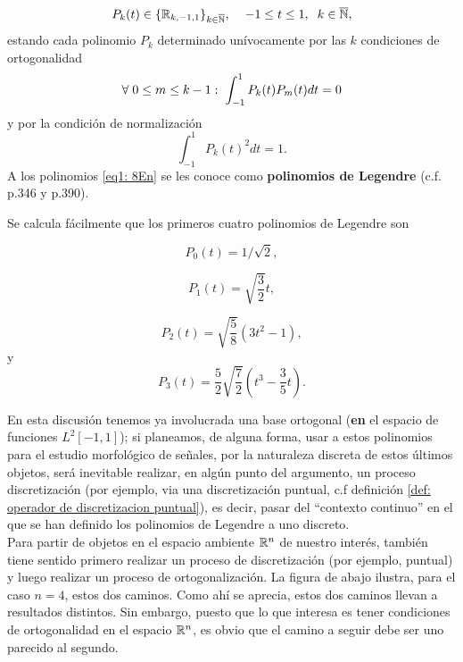 \begin{equation}
\label{eq1: 8En}
P_{k}(t)\in \{\mathbb{R}_{k, -1,1}\}_{k \in \overline{\mathbb{N}}}, \hspace{0.4cm}
-1 \leq t \leq 1, \hspace{0.2cm}
 k \in \overline{\mathbb{N}},
\end{equation}
estando cada polinomio $P_{k}$ determinado unívocamente
por las $k$ condiciones de ortogonalidad
\[
\forall \hspace{0.1cm} 0 \leq m \leq k-1: \hspace{0.1cm}
\int_{-1}^{1}{P_{k}(t)P_{m}(t)} dt = 0
\]
y por la condición de normalización 
\[
\int_{-1}^{1}{P_{k}(t)^{2}} dt = 1.
\]
A los polinomios \eqref{eq1: 8En}
se les conoce como \textbf{polinomios de Legendre}
 (c.f. \cite{friedberg} p.346
y \cite{DSML} p.390).

Se calcula fácilmente que los primeros cuatro 
polinomios de Legendre son

\[
P_{0}(t) = 1/\sqrt{2},
\]

\[
P_{1}(t) = \sqrt{\frac{3}{2}}t,
\]

\[
P_{2}(t) = \sqrt{\frac{5}{8}}\left( 3t^{2}-1 \right),
\]
y
\[
P_{3}(t) = \frac{5}{2} \sqrt{\frac{7}{2}}\left( t^{3}- \frac{3}{5}t\right).
\]

En esta discusión tenemos ya involucrada una base ortogonal
(\textbf{en} el espacio de funciones $L^{2}[-1,1]$);
si planeamos, de alguna forma, usar a estos polinomios
para el estudio morfológico de señales, por la naturaleza
discreta de estos últimos objetos, será
inevitable realizar, en algún punto 
del argumento, un proceso discretización
(por ejemplo, 
via una discretización
puntual, c.f definición \ref{def: operador de discretizacion puntual}), es decir,
pasar del ``contexto continuo'' en el que se han
definido los polinomios de Legendre a uno discreto. \\

Para partir de
objetos en el espacio ambiente
$\mathbb{R}^{n}$ de nuestro interés,
también tiene sentido primero realizar
un proceso de discretización (por ejemplo, 
puntual) y luego realizar
un proceso de ortogonalización. La figura
de abajo
ilustra, para el caso $n=4$, estos dos caminos.
Como ahí se aprecia, estos dos caminos llevan 
a resultados distintos. Sin embargo, puesto que lo
que interesa es tener condiciones de ortogonalidad
en el espacio $\mathbb{R}^{n}$, es obvio que 
el camino a seguir debe ser uno parecido al segundo. \\


